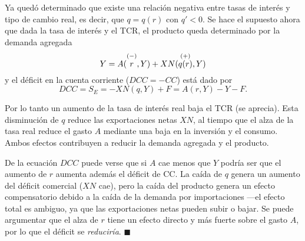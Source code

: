 \documentclass[DeGregorioResumen]{subfiles}
\begin{document}
Ya quedó determinado que existe una relación negativa entre tasas de interés y tipo de cambio real, es decir, que $q=q(r)$ con $q'<0$. Se hace el supuesto ahora que dada la tasa de interés y el TCR, el producto queda determinado por la demanda agregada
\begin{equation}
	Y = A(\overset{(-)}{\mathstrut r}, Y) + XN (\overset{(+)}{\mathstrut q(r)}, Y)
\end{equation}
y el déficit en la cuenta corriente ($DCC=-CC$) está dado por 
\begin{equation}
DCC = S_E = -XN(q, Y)+F=A(r, Y)-Y-F.
\end{equation}

Por lo tanto un aumento de la tasa de interés real baja el TCR (se aprecia). Esta disminución de $q$ reduce las exportaciones netas $XN$, al tiempo que el alza de la tasa real reduce el gasto $A$ mediante una baja en la inversión y el consumo. Ambos efectos contribuyen a reducir la demanda agregada y el producto.

De la ecuación $DCC$ puede verse que si $A$ cae menos que $Y$ podría ser que el aumento de $r$ aumenta además el déficit de CC. La caída de $q$ genera un aumento del déficit comercial ($XN$ cae), pero la caída del producto genera un efecto compensatorio debido a la caída de la demanda por importaciones ---el efecto total es ambiguo, ya que las exportaciones netas pueden subir o bajar. Se puede argumentar que el alza de $r$ tiene un efecto directo y más fuerte sobre el gasto $A$, por lo que el déficit se \emph{reduciría}. $\blacksquare$
\end{document}
